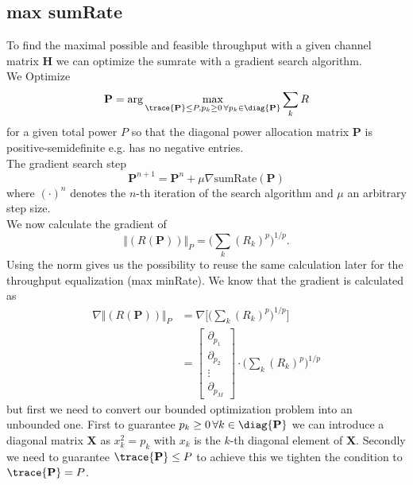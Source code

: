 \subsection{max sumRate}
To find the maximal possible and feasible throughput with a given channel matrix $\mathbf{H}$ we can optimize the sumrate with a gradient search algorithm.\\
We Optimize
\begin{equation}
	\mathbf{P} = \arg{\max_{\trace{\mathbf{P}}\leq P, p_k\geq 0\,\forall p_k\in \diag{\mathbf{P}}}{\sum_k{R}}}
\end{equation}
for a given total power $P$ so that the diagonal power allocation matrix $\mathbf{P}$ is positive-semidefinite e.g. has no negative entries.\\
The gradient search step
\begin{equation}
	\mathbf{P}^{n+1} = \mathbf{P}^n + \mu \nabla \text{sumRate}(\mathbf{P})
\end{equation}
where $(\cdot)^n$ denotes the $n$-th iteration of the search algorithm and $\mu$ an arbitrary step size.\\
We now calculate the gradient of
\begin{equation}
	\bigr\Vert{(R(\mathbf{P}))\bigl\Vert}_P = \Biggr(\sum_k{(R_k)^p}\Biggl)^{1/p}.
\end{equation}
Using the norm gives us the possibility to reuse the same calculation later for the throughput equalization (max minRate).
We know that the gradient is calculated as 
\begin{align}
	\nabla \bigr\Vert{(R(\mathbf{P}))\bigl\Vert}_P &= \nabla \Biggr[ \Biggr(\sum_k{(R_k)^p}\Biggl)^{1/p} \Biggl]\\
	&= \begin{bmatrix}
		\partial_{p_1}\\\partial_{p_2}\\\vdots\\\partial_{p_M}
	\end{bmatrix}
	\cdot \Biggr(\sum_k{(R_k)^p}\Biggl)^{1/p}
\end{align}
but first we need to convert our bounded optimization problem into an unbounded one. First to guarantee $p_k \geq 0 \, \forall k\in\diag{\mathbf{P}}$ we can introduce a diagonal matrix $\mathbf{X}$ as $x_k^2 = p_k$ with $x_k$ is the $k$-th diagonal element of $\mathbf{X}$. Secondly we need to guarantee $\trace{\mathbf{P}}\leq P$ to achieve this we tighten the condition to $\trace{\mathbf{P}}= P$.
